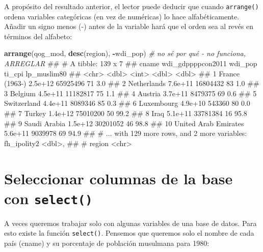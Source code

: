 \documentclass[]{book}
\newenvironment{Shaded}{\begin{snugshade}}{\end{snugshade}}
\newcommand{\KeywordTok}[1]{\textcolor[rgb]{0.13,0.29,0.53}{\textbf{#1}}}
\newcommand{\CommentTok}[1]{\textcolor[rgb]{0.56,0.35,0.01}{\textit{#1}}}
\newcommand{\OperatorTok}[1]{\textcolor[rgb]{0.81,0.36,0.00}{\textbf{#1}}}
\newcommand{\NormalTok}[1]{#1}
\begin{document}
A propósito del resultado anterior, el lector puede deducir que cuando
\texttt{arrange()} ordena variables categóricas (en vez de numéricas) lo
hace alfabéticamente. Añadir un signo menos (-) antes de la variable
hará que el orden sea al revés en términos del alfabeto:

\begin{Shaded}
\begin{Highlighting}[]
\KeywordTok{arrange}\NormalTok{(qog_mod, }\KeywordTok{desc}\NormalTok{(region), }\OperatorTok{-}\NormalTok{wdi_pop) }\CommentTok{# no sé por qué - no funciona, ARREGLAR}
\NormalTok{## # A tibble: 139 x 7}
\NormalTok{##                   cname wdi_gdppppcon2011  wdi_pop ti_cpi lp_muslim80}
\NormalTok{##                   <chr>             <dbl>    <int>  <dbl>       <dbl>}
\NormalTok{##  1       France (1963-)           2.5e+12 65925496     71         3.0}
\NormalTok{##  2          Netherlands           7.6e+11 16804432     83         1.0}
\NormalTok{##  3              Belgium           4.5e+11 11182817     75         1.1}
\NormalTok{##  4              Austria           3.7e+11  8479375     69         0.6}
\NormalTok{##  5          Switzerland           4.4e+11  8089346     85         0.3}
\NormalTok{##  6           Luxembourg           4.9e+10   543360     80         0.0}
\NormalTok{##  7               Turkey           1.4e+12 75010200     50        99.2}
\NormalTok{##  8                 Iraq           5.1e+11 33781384     16        95.8}
\NormalTok{##  9         Saudi Arabia           1.5e+12 30201052     46        98.8}
\NormalTok{## 10 United Arab Emirates           5.6e+11  9039978     69        94.9}
\NormalTok{## # ... with 129 more rows, and 2 more variables: fh_ipolity2 <dbl>,}
\NormalTok{## #   region <chr>}
\end{Highlighting}
\end{Shaded}

\section{\texorpdfstring{Seleccionar columnas de la base con
\texttt{select()}}{Seleccionar columnas de la base con select()}}\label{seleccionar-columnas-de-la-base-con-select}

A veces queremos trabajar solo con algunas variables de una base de
datos. Para esto existe la función \texttt{select()}. Pensemos que
queremos solo el nombre de cada país (cname) y su porcentaje de
población musulmana para 1980:
\end{document}
